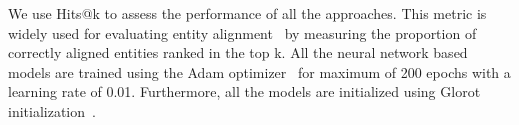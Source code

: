 	We use Hits@k to assess the performance of all the approaches. 
	This metric is widely used for evaluating entity alignment~\cite{hao2016joint,chen2016multilingual,sun2017cross,zhu2017iterative} by measuring the proportion of correctly aligned entities ranked in the top k. 
	All the neural network based models are trained using the Adam optimizer~\cite{Kingma2014Adam} for maximum of 200 epochs with a learning rate
    of 0.01. 
    Furthermore, all the models are initialized using Glorot initialization~\cite{Glorot2010Understanding}.
	
